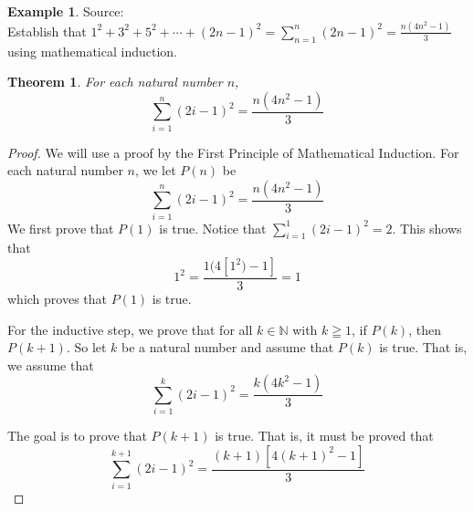 \documentclass{book}
\newtheorem{theorem}{Theorem}[section]
\theoremstyle{definition}
\newtheorem{example}{Example}[definition]
\theoremstyle{remark}
\newcommand{\bb}[1]{\mathbb{#1}}
\begin{document}
\newpage
\begin{example}
Source: \cite[Chap.1, S.1.1, Prob.1.1, Q.1.D]{david} \\ 

Establish that $1^2 + 3^2 + 5^2  + \cdots + (2n - 1)^2 = \sum_{n=1}^{n}{(2n-1)^2} = \frac{n(4n^2 - 1)}{3}$ using mathematical induction.
    \begin{tcolorbox}
        \begin{theorem}
            For each natural number $n$,
                \begin{equation*}
                    \sum_{i=1}^{n}{(2i-1)^2} = \frac{n(4n^2 - 1)}{3}
                \end{equation*}
        \end{theorem}
    \end{tcolorbox}

    \begin{proof}
        We will use a proof by the First Principle of Mathematical Induction. For each natural number $n$, we let $P(n)$ be
            \begin{equation*}
                \sum_{i=1}^{n}{(2i-1)^2} = \frac{n(4n^2 - 1)}{3}
            \end{equation*}
        We first prove that $P(1)$ is true. Notice that $\sum_{i=1}^{1}{(2i-1)^2} = 2$. This shows that   
            \begin{equation*}
                 1^2 = \frac{1(4[1^2) - 1]}{3} = 1
            \end{equation*}
        which proves that $P(1)$ is true. 
        
        For the inductive step, we prove that for all $k \in \bb{N}$ with $k \geqq 1$, if $P(k)$, then $P(k+1)$. So let $k$ be a natural number and assume that $P(k)$ is true. That is, we assume that 
            \begin{equation*}
                \sum_{i=1}^{k}{(2i-1)^2} = \frac{k(4k^2 - 1)}{3}
            \end{equation*}
        
        The goal is to prove that $P(k+1)$ is true. That is, it must be proved that  
            \begin{equation}
            \label{dne4}
                \sum_{i=1}^{k+1}{(2i-1)^2} = \frac{(k+1)[4(k+1)^2 - 1]}{3}              
            \end{equation}
        

\end{proof}
\end{example}
\end{document}
